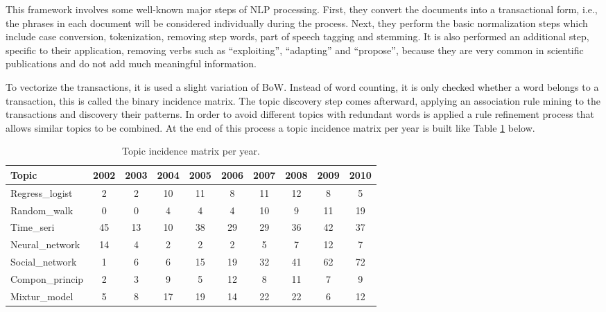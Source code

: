 This framework involves some well-known major steps of NLP processing. First, they convert the documents into a transactional form, i.e., the phrases in each document will be considered individually during the process. Next, they perform the basic normalization steps which include case conversion, tokenization, removing step words, part of speech tagging and stemming. It is also performed an additional step, specific to their application, removing verbs such as ``exploiting'', ``adapting'' and ``propose'', because they are very common in scientific publications and do not add much meaningful information.

To vectorize the transactions, it is used a slight variation of BoW. Instead of word counting, it is only checked whether a word belongs to a transaction, this is called the binary incidence matrix. The topic discovery step comes afterward, applying an association rule mining to the transactions and discovery their patterns. In order to avoid different topics with redundant words is applied a rule refinement process that allows similar topics to be combined. At the end of this process a topic incidence matrix per year is built like Table \ref{tab:incidence-matrix} below.

\begin{table}[h!]
	\centering
	\caption{Topic incidence matrix per year.}
	\label{tab:incidence-matrix}
	\begin{tabular}{l|ccccccccc}
		\toprule
		\textbf{Topic} & \textbf{2002} & \textbf{2003} & \textbf{2004} & \textbf{2005} & \textbf{2006} & \textbf{2007} & \textbf{2008} & \textbf{2009} & \textbf{2010} \\
		\midrule
		Regress\_logist & 2  & 2  & 10 & 11 & 8  & 11 & 12 & 8  & 5  \\
		Random\_walk    & 0  & 0  & 4  & 4  & 4  & 10 & 9  & 11 & 19 \\
		Time\_seri      & 45 & 13 & 10 & 38 & 29 & 29 & 36 & 42 & 37 \\
		Neural\_network & 14 & 4  & 2  & 2  & 2  & 5  & 7  & 12 & 7  \\
		Social\_network & 1  & 6  & 6  & 15 & 19 & 32 & 41 & 62 & 72 \\
		Compon\_princip & 2  & 3  & 9  & 5  & 12 & 8  & 11 & 7  & 9  \\
		Mixtur\_model   & 5  & 8  & 17 & 19 & 14 & 22 & 22 & 6  & 12 \\ \bottomrule
	\end{tabular}
\end{table}


